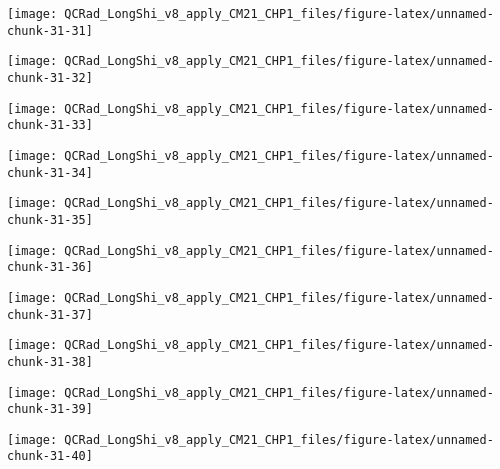 \documentclass[
  10pt,
  a4paper,oneside]{article}
\begin{document}
\begin{center}\texttt{[image: QCRad\_LongShi\_v8\_apply\_CM21\_CHP1\_files/figure-latex/unnamed-chunk-31-31]} \end{center}

\begin{center}\texttt{[image: QCRad\_LongShi\_v8\_apply\_CM21\_CHP1\_files/figure-latex/unnamed-chunk-31-32]} \end{center}

\begin{center}\texttt{[image: QCRad\_LongShi\_v8\_apply\_CM21\_CHP1\_files/figure-latex/unnamed-chunk-31-33]} \end{center}

\begin{center}\texttt{[image: QCRad\_LongShi\_v8\_apply\_CM21\_CHP1\_files/figure-latex/unnamed-chunk-31-34]} \end{center}

\begin{center}\texttt{[image: QCRad\_LongShi\_v8\_apply\_CM21\_CHP1\_files/figure-latex/unnamed-chunk-31-35]} \end{center}

\begin{center}\texttt{[image: QCRad\_LongShi\_v8\_apply\_CM21\_CHP1\_files/figure-latex/unnamed-chunk-31-36]} \end{center}

\begin{center}\texttt{[image: QCRad\_LongShi\_v8\_apply\_CM21\_CHP1\_files/figure-latex/unnamed-chunk-31-37]} \end{center}

\begin{center}\texttt{[image: QCRad\_LongShi\_v8\_apply\_CM21\_CHP1\_files/figure-latex/unnamed-chunk-31-38]} \end{center}

\begin{center}\texttt{[image: QCRad\_LongShi\_v8\_apply\_CM21\_CHP1\_files/figure-latex/unnamed-chunk-31-39]} \end{center}

\begin{center}\texttt{[image: QCRad\_LongShi\_v8\_apply\_CM21\_CHP1\_files/figure-latex/unnamed-chunk-31-40]} \end{center}
\end{document}
